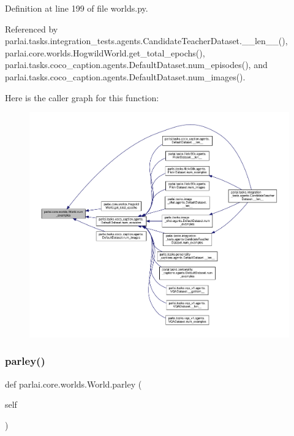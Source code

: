 Definition at line 199 of file worlds.\+py.



Referenced by parlai.\+tasks.\+integration\+\_\+tests.\+agents.\+Candidate\+Teacher\+Dataset.\+\_\+\+\_\+len\+\_\+\+\_\+(), parlai.\+core.\+worlds.\+Hogwild\+World.\+get\+\_\+total\+\_\+epochs(), parlai.\+tasks.\+coco\+\_\+caption.\+agents.\+Default\+Dataset.\+num\+\_\+episodes(), and parlai.\+tasks.\+coco\+\_\+caption.\+agents.\+Default\+Dataset.\+num\+\_\+images().

Here is the caller graph for this function\+:
\nopagebreak
\begin{figure}[H]
\begin{center}
\leavevmode
\includegraphics[width=350pt]{classparlai_1_1core_1_1worlds_1_1World_a0402b615564d760fac542b8c5a504be5_icgraph}
\end{center}
\end{figure}
\mbox{\label{classparlai_1_1core_1_1worlds_1_1World_ac7e23e08adad68116e72162cd419786b}} 
\subsubsection{\texorpdfstring{parley()}{parley()}}
{\footnotesize\ttfamily def parlai.\+core.\+worlds.\+World.\+parley (\begin{DoxyParamCaption}\item[{}]{self }\end{DoxyParamCaption})}

